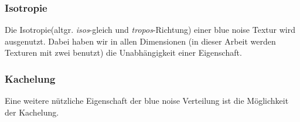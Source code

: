 \subsubsection{Isotropie}
Die Isotropie(altgr. \textit{isos}-gleich und \textit{tropos}-Richtung)
einer blue noise Textur wird ausgenutzt. Dabei haben wir in allen
Dimensionen (in dieser Arbeit werden Texturen mit zwei benutzt) 
die Unabhängigkeit einer Eigenschaft. 


\subsubsection{Kachelung}
Eine weitere nützliche Eigenschaft der blue noise Verteilung ist die 
Möglichkeit der Kachelung. 